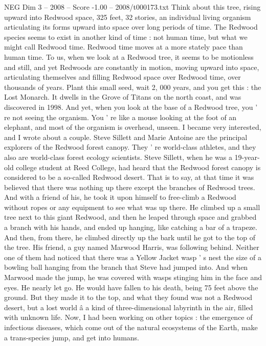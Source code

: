 \begin{textsample}{NEG Dim 3 – 2008 – Score -1.00 – 2008/t000173.txt}
Think about this tree, rising upward into Redwood space, 325 feet, 32 stories, an individual living organism articulating its forms upward into space over long periods of time.
The Redwood species seems to exist in another kind of time : not human time, but what we might call Redwood time.
Redwood time moves at a more stately pace than human time.
To us, when we look at a Redwood tree, it seems to be motionless and still, and yet Redwoods are constantly in motion, moving upward into space, articulating themselves and filling Redwood space over Redwood time, over thousands of years.
Plant this small seed, wait 2, 000 years, and you get this : the Lost Monarch.
It dwells in the Grove of Titans on the north coast, and was discovered in 1998.
And yet, when you look at the base of a Redwood tree, you ' re not seeing the organism.
You ' re like a mouse looking at the foot of an elephant, and most of the organism is overhead, unseen.
I became very interested, and I wrote about a couple.
Steve Sillett and Marie Antoine are the principal explorers of the Redwood forest canopy.
They ' re world-class athletes, and they also are world-class forest ecology scientists.
Steve Sillett, when he was a 19-year-old college student at Reed College, had heard that the Redwood forest canopy is considered to be a so-called Redwood desert.
That is to say, at that time it was believed that there was nothing up there except the branches of Redwood trees.
And with a friend of his, he took it upon himself to free-climb a Redwood without ropes or any equipment to see what was up there.
He climbed up a small tree next to this giant Redwood, and then he leaped through space and grabbed a branch with his hands, and ended up hanging, like catching a bar of a trapeze.
And then, from there, he climbed directly up the bark until he got to the top of the tree.
His friend, a guy named Marwood Harris, was following behind.
Neither one of them had noticed that there was a Yellow Jacket wasp ' s nest the size of a bowling ball hanging from the branch that Steve had jumped into.
And when Marwood made the jump, he was covered with wasps stinging him in the face and eyes.
He nearly let go.
He would have fallen to his death, being 75 feet above the ground.
But they made it to the top, and what they found was not a Redwood desert, but a lost world â a kind of three-dimensional labyrinth in the air, filled with unknown life.
Now, I had been working on other topics : the emergence of infectious diseases, which come out of the natural ecosystems of the Earth, make a trans-species jump, and get into humans.

\end{textsample}
